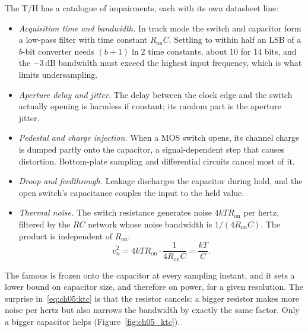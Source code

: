 The T/H has a catalogue of impairments, each with its own datasheet line:
\begin{itemize}
\item \emph{Acquisition time and bandwidth.} In track mode the switch and capacitor form a
low-pass filter with time constant $R_{\text{on}}C$. Settling to within half an LSB of a
$b$-bit converter needs $(b+1)\ln2$ time constants, about 10 for 14 bits, and the $-3$\,dB
bandwidth must exceed the highest input frequency, which is what limits undersampling.
\item \emph{Aperture delay and jitter.} The delay between the clock edge and the switch
actually opening is harmless if constant; its random part is the aperture jitter.
\item \emph{Pedestal and charge injection.} When a MOS switch opens, its channel charge is
dumped partly onto the capacitor, a signal-dependent step that causes distortion.
Bottom-plate sampling and differential circuits cancel most of it.
\item \emph{Droop and feedthrough.} Leakage discharges the capacitor during hold, and the
open switch's capacitance couples the input to the held value.
\item \emph{Thermal noise.} The switch resistance generates noise $4kTR_{\text{on}}$ per
hertz, filtered by the $RC$ network whose noise bandwidth is $1/(4R_{\text{on}}C)$. The product
is independent of $R_{\text{on}}$:
\begin{equation}
\overline{v_n^2}=4kTR_{\text{on}}\cdot\frac{1}{4R_{\text{on}}C}=\frac{kT}{C}.
\label{eq:ch05:ktc}
\end{equation}
\end{itemize}
The famous  is frozen onto the capacitor at every sampling instant, and it
sets a lower bound on capacitor size, and therefore on power, for a given resolution. The
surprise in~\eqref{eq:ch05:ktc} is that the resistor cancels: a bigger resistor makes more noise
per hertz but also narrows the bandwidth by exactly the same factor. Only a bigger capacitor helps
(Figure~\ref{fig:ch05_ktc}).



